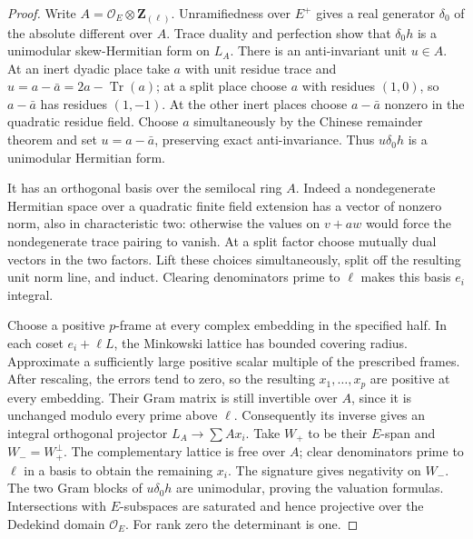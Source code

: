 \begin{proof}
Write $A=\mathcal O_E\otimes\mathbf Z_{(\ell)}$.
Unramifiedness over $E^+$ gives a real generator $\delta_0$ of
the absolute different over $A$. Trace duality and perfection
show that $\delta_0h$ is a unimodular skew-Hermitian form on $L_A$.
There is an anti-invariant unit $u\in A$.
At an inert dyadic place take $a$ with unit residue trace and
$u=a-\bar a=2a-\operatorname{Tr}(a)$; at a split place choose
$a$ with residues $(1,0)$, so $a-\bar a$ has residues $(1,-1)$.
At the other inert places choose
$a-\bar a$ nonzero in the quadratic residue field.
Choose $a$ simultaneously by the Chinese remainder theorem and
set $u=a-\bar a$, preserving exact anti-invariance.
Thus $u\delta_0h$ is a unimodular Hermitian form.

It has an orthogonal basis over the semilocal ring $A$.
Indeed a nondegenerate Hermitian space over a quadratic finite
field extension has a vector of nonzero norm, also in characteristic
two: otherwise the values on $v+aw$ would force the nondegenerate
trace pairing to vanish. At a split factor choose mutually dual
vectors in the two factors. Lift these choices simultaneously,
split off the resulting unit norm line, and induct.
Clearing denominators prime to $\ell$ makes this basis $e_i$ integral.

Choose a positive $p$-frame at every complex embedding in the
specified half. In each coset $e_i+\ell L$, the Minkowski lattice
has bounded covering radius. Approximate a sufficiently large
positive scalar multiple of the prescribed frames. After rescaling,
the errors tend to zero, so the resulting $x_1,\ldots,x_p$ are
positive at every embedding. Their Gram matrix is still invertible
over $A$, since it is unchanged modulo every prime above $\ell$.
Consequently its inverse gives an integral orthogonal projector
$L_A\to\sum A x_i$.
Take $W_+$ to be their $E$-span and $W_-=W_+^\perp$.
The complementary lattice is free over $A$; clear denominators
prime to $\ell$ in a basis to obtain the remaining $x_i$.
The signature gives negativity on $W_-$.
The two Gram blocks of $u\delta_0h$ are unimodular, proving the
valuation formulas. Intersections with $E$-subspaces are saturated
and hence projective over the Dedekind domain $\mathcal O_E$.
For rank zero the determinant is one.
\end{proof}

